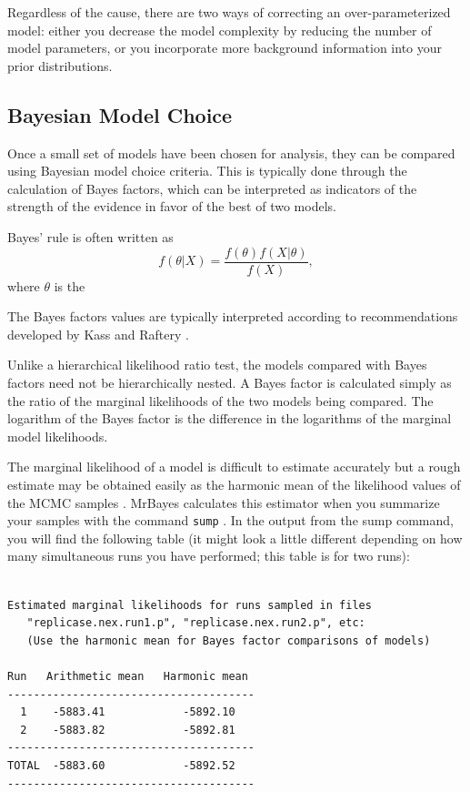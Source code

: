 \documentclass[12pt]{book}
\newcommand{\ttt}[1]{\texttt{#1} }
\begin{document}
Regardless of the cause, there are two ways of correcting an over-parameterized model: either you
decrease the model complexity by reducing the number of model parameters, or you incorporate
more background information into your prior distributions.

\subsection{Bayesian Model Choice}
Once a small set of models have been chosen for analysis, they can be compared using
Bayesian model choice criteria. This is typically done through the
calculation of Bayes factors, which can be interpreted as indicators of the strength of the
evidence in favor of the best of two models.

Bayes' rule is often written as
$$
f(\theta|X) = \frac{f(\theta)f(X|\theta)}{f(X)},
$$
where $\theta$ is the 


The Bayes factors values are typically
interpreted according to recommendations developed by Kass and Raftery \citep{kass95}.

Unlike a hierarchical likelihood ratio test, the models compared with Bayes factors need
not be hierarchically nested. A Bayes factor is calculated simply as the ratio of the
marginal likelihoods of the two models being compared. The logarithm of the Bayes
factor is the difference in the logarithms of the marginal model likelihoods.

The marginal likelihood of a model is difficult to estimate accurately but a rough estimate
may be obtained easily as the harmonic mean of the likelihood values of the MCMC
samples \citep{newton94}. MrBayes calculates this estimator when you
summarize your samples with the command \ttt{sump}. In the output from the sump
command, you will find the following table (it might look a little different depending on
how many simultaneous runs you have performed; this table is for two runs):

\begin{singlespacing}
\small
\begin{verbatim}

Estimated marginal likelihoods for runs sampled in files
   "replicase.nex.run1.p", "replicase.nex.run2.p", etc:
   (Use the harmonic mean for Bayes factor comparisons of models)

Run   Arithmetic mean   Harmonic mean
--------------------------------------
  1    -5883.41            -5892.10
  2    -5883.82            -5892.81
--------------------------------------
TOTAL  -5883.60            -5892.52
--------------------------------------
\end{verbatim}
\normalsize
\end{singlespacing}
\end{document}
